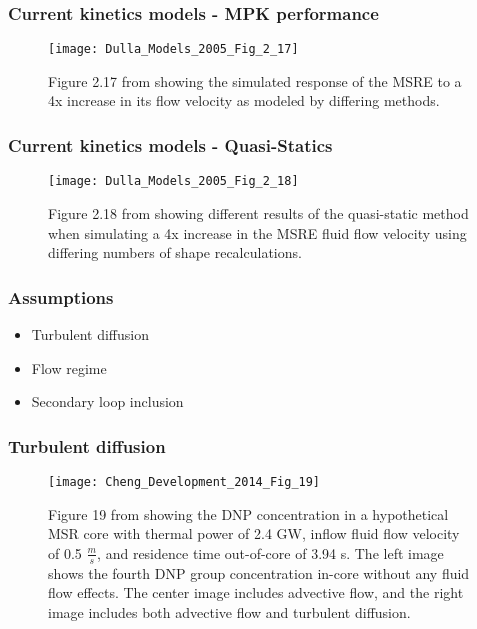 \documentclass{beamer}
\begin{document}
\begin{frame}
\frametitle{Current kinetics models - MPK performance}

    \begin{figure}
        \centering
        \texttt{[image: Dulla\_Models\_2005\_Fig\_2\_17]}
        \caption{Figure 2.17 from \cite{dulla_models_2005} showing the simulated response of the MSRE
   to a 4x increase in its flow velocity as modeled by differing methods.}
        \label{fig:dulla_models_mpk}
    \end{figure}

\end{frame}

\begin{frame}
\frametitle{Current kinetics models - Quasi-Statics}

    \begin{figure}
        \centering
        \texttt{[image: Dulla\_Models\_2005\_Fig\_2\_18]}
        \caption{Figure 2.18 from \cite{dulla_models_2005} showing different results of the
   quasi-static method when simulating a 4x increase in the MSRE fluid flow velocity using
   differing numbers of shape recalculations.}
        \label{fig:dulla_models_qs}
    \end{figure}

\end{frame}

\begin{frame}
\frametitle{Assumptions}

    \begin{itemize}
        \item Turbulent diffusion
        \item Flow regime
        \item Secondary loop inclusion
    \end{itemize}

\end{frame}

\begin{frame}
\frametitle{Turbulent diffusion}

\begin{figure}[H]
   \centering
   \texttt{[image: Cheng\_Development\_2014\_Fig\_19]}
   \caption{Figure 19 from \cite{cheng_development_2014} showing the DNP
   concentration in a
   hypothetical MSR core with thermal power of 2.4 GW, inflow fluid flow
   velocity of 0.5
   $\frac{m}{s}$, and residence time out-of-core of 3.94 s.
   The left image shows the fourth
   DNP group concentration in-core without any fluid flow effects. The center
   image
   includes advective flow, and the right image includes both advective flow and
   turbulent diffusion.} 
   \label{fig:cheng_diffusion}
\end{figure}

\end{frame}
\end{document}
